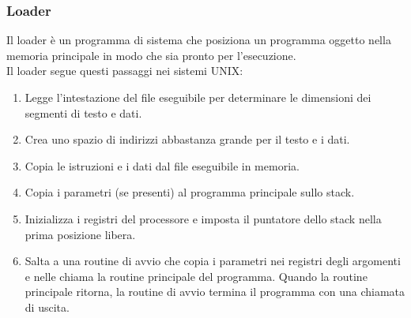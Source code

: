 \documentclass[12pt,a4paper]{article}
\begin{document}
\subsubsection{Loader}
Il loader è un programma di sistema che posiziona un programma oggetto nella memoria principale in modo che sia pronto per l'esecuzione.\\
Il loader segue questi passaggi nei sistemi UNIX:
\begin{enumerate}
\item Legge l'intestazione del file eseguibile per determinare le dimensioni dei segmenti di testo e dati.
\item Crea uno spazio di indirizzi abbastanza grande per il testo e i dati.
\item Copia le istruzioni e i dati dal file eseguibile in memoria.
\item Copia i parametri (se presenti) al programma principale sullo stack.
\item Inizializza i registri del processore e imposta il puntatore dello stack nella prima posizione libera.
\item Salta a una routine di avvio che copia i parametri nei registri degli argomenti e nelle chiama la routine principale del programma. Quando la routine principale ritorna, la routine di avvio termina il programma con una chiamata di uscita.
\end{enumerate}
\end{document}
